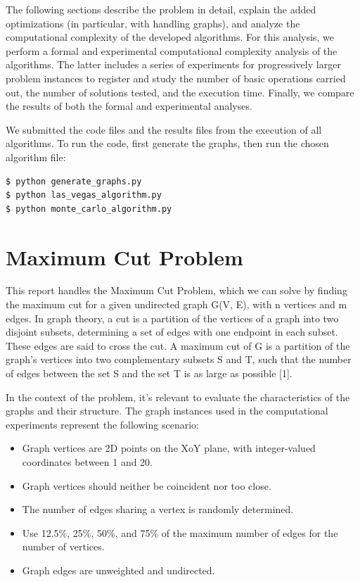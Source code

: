 \documentclass[]{revdetua}
\begin{document}
The following sections describe the problem in detail, explain the added optimizations (in particular, with handling graphs), and analyze the computational complexity of the developed algorithms. For this analysis, we perform a formal and experimental computational complexity analysis of the algorithms. The latter includes a series of experiments for progressively larger problem instances to register and study the number of basic operations carried out, the number of solutions tested, and the execution time. Finally, we compare the results of both the formal and experimental analyses.

We submitted the code files and the results files from the execution of all algorithms. To run the code, first generate the graphs, then run the chosen algorithm file:

\begin{verbatim}
$ python generate_graphs.py 
$ python las_vegas_algorithm.py
$ python monte_carlo_algorithm.py
\end{verbatim}

\section{Maximum Cut Problem}

This report handles the Maximum Cut Problem, which we can solve by finding the maximum cut for a given undirected graph G(V, E), with n vertices and m edges. In graph theory, a cut is a partition of the vertices of a graph into two disjoint subsets, determining a set of edges with one endpoint in each subset. These edges are said to cross the cut. A maximum cut of G is a partition of the graph's vertices into two complementary subsets S and T, such that the number of edges between the set S and the set T is as large as possible [1]. 

In the context of the problem, it's relevant to evaluate the characteristics of the graphs and their structure. The graph instances used in the computational experiments represent the following scenario:
\begin{itemize}
\item Graph vertices are 2D points on the XoY plane, with integer-valued coordinates between 1 and 20.
\item Graph vertices should neither be coincident nor too close.
\item The number of edges sharing a vertex is randomly determined.
\item Use 12.5\%, 25\%, 50\%, and 75\% of the maximum number of edges for the number of vertices.
\item Graph edges are unweighted and undirected.
\end{itemize}
\end{document}
